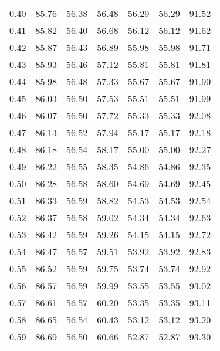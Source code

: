 \begin{tabular}{|c|c|c|c|c|c|c|}
      0.40 &     85.76 &     56.38 &      56.48 &   56.29 &      56.29 &         91.52 \\
      0.41 &     85.82 &     56.40 &      56.68 &   56.12 &      56.12 &         91.62 \\
      0.42 &     85.87 &     56.43 &      56.89 &   55.98 &      55.98 &         91.71 \\
      0.43 &     85.93 &     56.46 &      57.12 &   55.81 &      55.81 &         91.81 \\
      0.44 &     85.98 &     56.48 &      57.33 &   55.67 &      55.67 &         91.90 \\
      0.45 &     86.03 &     56.50 &      57.53 &   55.51 &      55.51 &         91.99 \\
      0.46 &     86.07 &     56.50 &      57.72 &   55.33 &      55.33 &         92.08 \\
      0.47 &     86.13 &     56.52 &      57.94 &   55.17 &      55.17 &         92.18 \\
      0.48 &     86.18 &     56.54 &      58.17 &   55.00 &      55.00 &         92.27 \\
      0.49 &     86.22 &     56.55 &      58.35 &   54.86 &      54.86 &         92.35 \\
      0.50 &     86.28 &     56.58 &      58.60 &   54.69 &      54.69 &         92.45 \\
      0.51 &     86.33 &     56.59 &      58.82 &   54.53 &      54.53 &         92.54 \\
      0.52 &     86.37 &     56.58 &      59.02 &   54.34 &      54.34 &         92.63 \\
      0.53 &     86.42 &     56.59 &      59.26 &   54.15 &      54.15 &         92.72 \\
      0.54 &     86.47 &     56.57 &      59.51 &   53.92 &      53.92 &         92.83 \\
      0.55 &     86.52 &     56.59 &      59.75 &   53.74 &      53.74 &         92.92 \\
      0.56 &     86.57 &     56.59 &      59.99 &   53.55 &      53.55 &         93.02 \\
      0.57 &     86.61 &     56.57 &      60.20 &   53.35 &      53.35 &         93.11 \\
      0.58 &     86.65 &     56.54 &      60.43 &   53.12 &      53.12 &         93.20 \\
      0.59 &     86.69 &     56.50 &      60.66 &   52.87 &      52.87 &         93.30 \\

\end{tabular}
